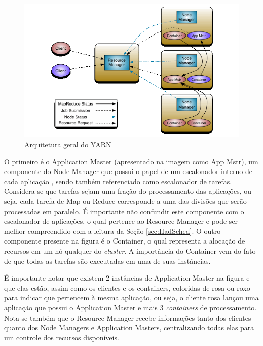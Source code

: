 \begin{figure}[!hbt]
   \centering
   \includegraphics[width=12cm]{figuras/Figura06-YarnArch.png}
   \caption{Arquitetura geral do YARN \cite{YARN}}
   \label{fig:ArqYARN}
\end{figure}

O primeiro é o Application Master (apresentado na imagem como App Mstr), um componente do Node Manager que possui o papel de um escalonador interno de cada aplicação , sendo também referenciado como escalonador de tarefas. Considera-se que tarefas sejam uma fração do processamento das aplicações, ou seja, cada tarefa de Map ou Reduce corresponde a uma das divisões que serão processadas em paralelo. É importante não confundir este componente com o escalonador de aplicações, o qual pertence ao Resource Manager e pode ser melhor compreendido com a leitura da Seção \ref{sec:HadSched}. O outro componente presente na figura é o Container, o qual representa a alocação de recursos em um nó qualquer do \textit{cluster}. A importância do Container vem do fato de que todas as tarefas são executadas em uma de suas instâncias.

É importante notar que existem 2 instâncias de Application Master na figura e que elas estão, assim como os clientes e os containers, coloridas de rosa ou roxo para indicar que pertencem à mesma aplicação, ou seja, o cliente rosa lançou uma aplicação que possui o Application Master e mais 3 \textit{containers} de processamento. Nota-se também que o Resource Manager recebe informações tanto dos clientes quanto dos Node Managers e Application Masters, centralizando todas elas para um controle dos recursos disponíveis.

